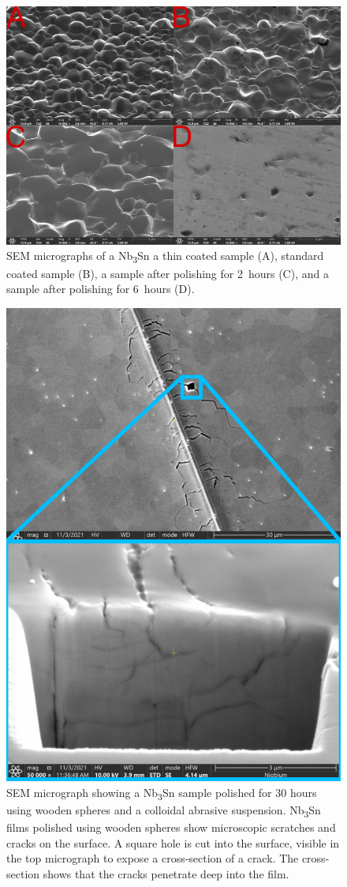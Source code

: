 \documentclass[reprint,amsmath,amssymb,aps]{revtex4-2}%
\begin{document}
\begin{figure}[t]%
\centering%
\includegraphics[width=0.8\columnwidth]{../doc/figs/SEM_Images.png}%
\caption{SEM micrographs of a Nb\textsubscript{3}Sn a thin coated sample (A), standard coated sample (B), a sample after polishing for 2~hours (C), and a sample after polishing for 6~hours (D).}%
\label{fig:semimages}%
\end{figure}

%


\begin{figure}[t]%
\centering%
\includegraphics[width=0.8\columnwidth]{../doc/figs/Sample_Surface_Scratches.png}%
\caption{SEM micrograph showing a Nb\textsubscript{3}Sn sample polished for 30 hours using wooden spheres and a colloidal abrasive suspension. Nb\textsubscript{3}Sn films polished using wooden spheres show microscopic scratches and cracks on the surface. A square hole is cut into the surface, visible in the top micrograph to expose a cross-section of a crack. The cross-section shows that the cracks penetrate deep into the film.}%
\label{fig:samplesurfacescratches}%
\end{figure}
\end{document}
